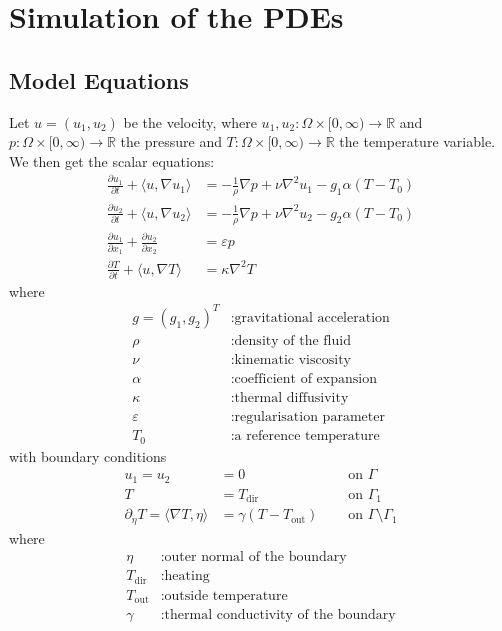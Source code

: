\documentclass{article}
\begin{document}
\section{Simulation of the PDEs}
\subsection{Model Equations}
Let $u= (u_1,u_2)$ be the velocity, where $u_1,u_2: \Omega \times [0,\infty) \to \mathbb{R}$ and $p: \Omega \times [0,\infty) \to \mathbb{R}$ the pressure and $T : \Omega \times [0,\infty) \to \mathbb{R}$ the temperature variable. We then get the scalar equations:
\begin{align}
\frac{\partial u_1}{\partial t} + \langle u,\nabla u_1\rangle  &= -\frac{1}{\rho}\nabla p + \nu \nabla^2 u_1 - g_1\alpha (T-T_0) \label{modeleq:1}\\
\frac{\partial u_2}{\partial t} + \langle u,\nabla u_2\rangle  &= -\frac{1}{\rho}\nabla p + \nu \nabla^2 u_2 - g_2\alpha (T-T_0) \label{modeleq:2}\\
\frac{\partial u_1}{\partial x_1} + \frac{\partial u_2}{\partial x_2} &= \varepsilon p \label{modeleq:3}\\
\frac{\partial T}{\partial t} + \langle u,\nabla T\rangle &= \kappa \nabla^2 T \label{modeleq:4}
\end{align}
where 
\begin{align*}
	g = \left(g_1,g_2\right)^T &: \text{gravitational acceleration}\\
	\rho &: \text{density of the fluid} \\
	\nu &: \text{kinematic viscosity} \\
	\alpha &: \text{coefficient of expansion} \\
	\kappa &: \text{thermal diffusivity} \\
	\varepsilon &: \text{regularisation parameter} \\
	T_0 &: \text{a reference temperature}
\end{align*}
with boundary conditions
\begin{align}
u_1 = u_2 &= 0 \quad &\text{ on } \Gamma\\
T &= T_\text{dir}\quad &\text{ on } \Gamma_1\\
\partial_\eta T = \langle \nabla T, \eta \rangle &= \gamma (T-T_\text{out}) \quad &\text{ on } \Gamma \setminus\Gamma_1
\end{align}
where
\begin{align*}
 \eta &: \text{outer normal of the boundary} \\
T_\text{dir} &: \text{heating} \\
T_\text{out} &: \text{outside temperature} \\
\gamma &: \text{thermal conductivity of the boundary}
 \end{align*}
\end{document}
